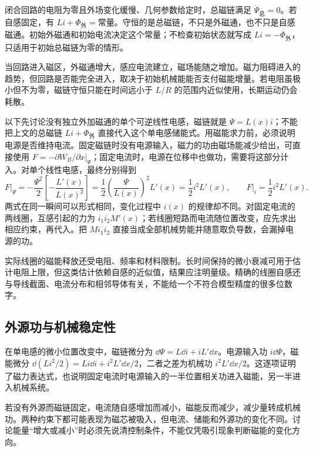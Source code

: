 闭合回路的电阻为零且外场变化缓慢、几何参数给定时，总磁链满足 $\dot\Psi_{\text{总}}=0$。若自感固定，有 $Li+\Phi_{\text{外}}=\text{常量}$。守恒的是总磁链，不只是外磁通，也不只是自感磁通。初始外磁通和初始电流决定这个常量；不检查初始状态就写成 $Li=-\Phi_{\text{外}}$，只适用于初始总磁链为零的情形。

当回路进入磁区，外磁通增大，感应电流建立，磁场能随之增加。磁力阻碍进入的趋势，但回路是否能完全进入，取决于初始机械能能否支付磁能增量。若电阻虽极小但不为零，磁链守恒只能在时间远小于 $L/R$ 的范围内近似使用，长期运动仍会耗散。

以下先讨论没有独立外加磁通的单个可逆线性电感，磁链就是 $\Psi=L(x)i$；不能把上文的总磁链 $Li+\Phi_{\text{外}}$ 直接代入这个单电感储能式。用磁能求力前，必须说明电源是否维持电流。固定磁链时没有电源输入，磁力的功由磁场能减少给出，可直接使用 $F=-\partial W_B/\partial x|_\Psi$；固定电流时，电源在位移中也做功，需要将这部分计入。对单个线性电感，最终分别得到
\[F\big|_\Psi=-\frac{\Psi^2}{2}\left[-\frac{L'(x)}{L(x)^2}\right]
=\frac12\left(\frac{\Psi}{L(x)}\right)^2L'(x)
=\frac12i^2L'(x),\qquad F\big|_i=\frac12i^2L'(x).\]
两式在同一瞬间可以形式相同，变化过程中 $i(x)$ 的规律却不同。对固定电流的两线圈，互感引起的力为 $i_1i_2M'(x)$；若线圈短路而电流随位置改变，应先求出相应约束，再代入。把 $Mi_1i_2$ 直接当成全部机械势能并随意取负导数，会漏掉电源的功。

实际线圈的磁能释放还受电阻、频率和材料限制。长时间保持的微小衰减可用于估计电阻上限，但这类估计依赖自感的近似值，结果应注明量级。精确的线圈自感还与导线截面、电流分布和相邻导体有关，不能给一个不符合模型精度的很多位数字。



\subsection{外源功与机械稳定性}

在单电感的微小位置改变中，磁链微分为 $\dd\Psi=L\dd i+iL'\dd x$。电源输入功 $i\dd\Psi$，磁能微分 $\dd(Li^2/2)=Li\dd i+i^2L'\dd x/2$，二者之差为机械功 $i^2L'\dd x/2$。这逐项证明了磁力表达式，也说明固定电流时电源输入的一半位置相关功进入磁能，另一半进入机械系统。

若没有外源而磁链固定，电流随自感增加而减小，磁能反而减少，减少量转成机械功。两种约束下都可能表现为磁芯被吸入，但电流、储能和外源功的变化不同。讨论能量“增大或减小”时必须先说清控制条件，不能仅凭吸引现象判断磁能的变化方向。


